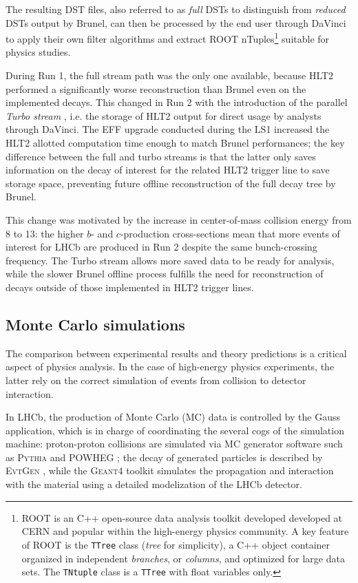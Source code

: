 The resulting DST files, also referred to as \textit{full} DSTs to distinguish from \textit{reduced} DSTs output by Brunel, can then be processed by the end user through DaVinci to apply their own filter algorithms and extract ROOT nTuples\footnote{ROOT \cite{ANTCHEVA20092499} is an C++ open-source data analysis toolkit developed developed at CERN and popular within the high-energy physics community. A key feature of ROOT is the \texttt{TTree} class (\textit{tree} for simplicity), a C++ object container organized in independent \textit{branches}, or \textit{columns}, and optimized for large data sets. The \texttt{TNtuple} class is a \texttt{TTree} with float variables only.} suitable for physics studies.

During Run 1, the full stream path was the only one available, because HLT2 performed a significantly worse reconstruction than Brunel even on the implemented decays.
This changed in Run 2 with the introduction of the parallel \textit{Turbo stream} \cite{Benson_2015}, i.e. the storage of HLT2 output for direct usage by analysts through DaVinci.
The EFF upgrade conducted during the LS1 increased the HLT2 allotted computation time enough to match
Brunel performances;
the key difference between the full and turbo streams is that the latter only saves information on the decay of interest for the related HLT2 trigger line to save storage space, preventing future offline reconstruction of the full decay tree by Brunel.

This change was motivated by the increase in center-of-mass collision energy from \SI{8}{\tev} to \SI{13}{\tev}: the higher $b$- and $c$-production cross-sections mean that more events of interest for LHCb are produced in Run 2 despite the same bunch-crossing frequency.
The Turbo stream allows more saved data to be ready for analysis, while the slower Brunel offline process fulfills the need for reconstruction of decays outside of those implemented in HLT2 trigger lines.

\subsection{Monte Carlo simulations}
\label{sec:2:monte_carlo}
The comparison between experimental results and theory predictions is a critical aspect of physics analysis.
In the case of high-energy physics experiments, the latter rely on the correct simulation of events from collision to detector interaction.

In LHCb, the production of Monte Carlo (MC) data is controlled by the Gauss application, which is in charge of coordinating the several cogs of the simulation machine:
proton-proton collisions are simulated via MC generator software such as \textsc{Pythia} \cite{Pythia2015} and \textsc{POWHEG} \cite{Alioli:2010xd}; the decay of generated particles is described by \textsc{EvtGen} \cite{Ryd:2005zz}, while the \textsc{Geant4} toolkit \cite{AGOSTINELLI2003250} simulates the propagation and interaction with the material using a detailed modelization of the LHCb detector.

